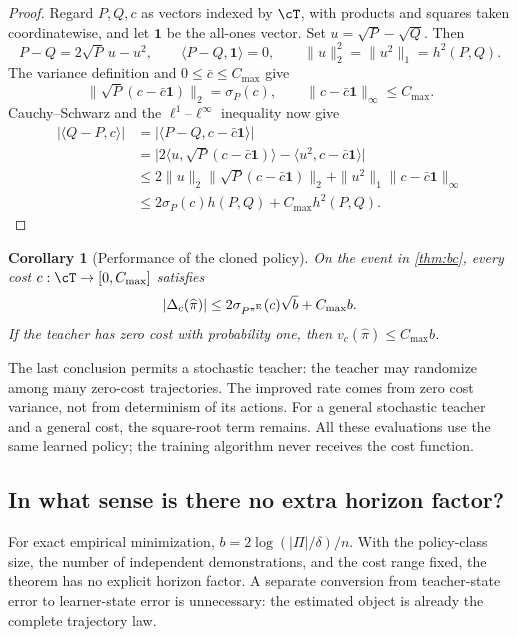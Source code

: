 \documentclass[11pt,twoside]{article}
\newtheorem{corollary}[theorem]{Corollary}
\theoremstyle{definition}
\theoremstyle{remark}
\begin{document}
\begin{proof}
Regard $P,Q,c$ as vectors indexed by $\cT$, with products and squares
taken coordinatewise, and let $\mathbf1$ be the all-ones vector.
Set $u=\sqrt P-\sqrt Q$. Then
\[
 P-Q=2\sqrt P\,u-u^2,\qquad
 \langle P-Q,\mathbf1\rangle=0,\qquad
 \|u\|_2^2=\|u^2\|_1=h^2(P,Q).
\]
The variance definition and $0\le\bar c\le C_{\max}$ give
\[
 \|\sqrt P(c-\bar c\mathbf1)\|_2=\sigma_P(c),\qquad
 \|c-\bar c\mathbf1\|_\infty\le C_{\max}.
\]
Cauchy--Schwarz and the $\ell^1$--$\ell^\infty$ inequality now give
\[
\begin{aligned}
 |\langle Q-P,c\rangle|
 &=|\langle P-Q,c-\bar c\mathbf1\rangle|\\
 &=\bigl|2\langle u,\sqrt P(c-\bar c\mathbf1)\rangle
          -\langle u^2,c-\bar c\mathbf1\rangle\bigr|\\
 &\le2\|u\|_2\|\sqrt P(c-\bar c\mathbf1)\|_2
       +\|u^2\|_1\|c-\bar c\mathbf1\|_\infty\\
 &\le2\sigma_P(c)h(P,Q)+C_{\max}h^2(P,Q).
\end{aligned}
\]
\end{proof}

\begin{corollary}[Performance of the cloned policy]
\label{cor:performance}
On the event in \cref{thm:bc}, every cost
$c:\cT\to[0,C_{\max}]$ satisfies
\begin{equation}
 |\Delta_c(\widehat\pi)|
 \le 2\sigma_{P^{\pi^{\rm E}}}(c)\sqrt b+C_{\max}b.
 \label{eq:performance}
\end{equation}
If the teacher has zero cost with probability one, then
$v_c(\widehat\pi)\le C_{\max}b$.
\end{corollary}

The last conclusion permits a stochastic teacher: the teacher may randomize
among many zero-cost trajectories. The improved rate comes from zero cost
variance, not from determinism of its actions. For a general stochastic
teacher and a general cost, the square-root term remains.
All these evaluations use the same learned policy; the training algorithm
never receives the cost function.

\subsection{In what sense is there no extra horizon factor?}

For exact empirical minimization, $b=2\log(|\Pi|/\delta)/n$. With the
policy-class size, the number of independent demonstrations, and the cost
range fixed, the theorem has no explicit horizon factor. A separate
conversion from teacher-state error to learner-state error is unnecessary:
the estimated object is already the complete trajectory law.
\end{document}
